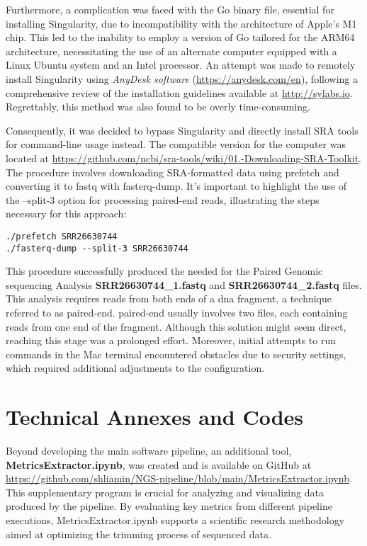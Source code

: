 Furthermore, a complication was faced with the Go binary file, essential for installing Singularity, due to incompatibility with the architecture of Apple's M1 chip. This led to the inability to employ a version of Go tailored for the ARM64 architecture, necessitating the use of an alternate computer equipped with a Linux Ubuntu system and an Intel processor. An attempt was made to remotely install Singularity using \textit{AnyDesk software} (\url{https://anydesk.com/en}), following a comprehensive review of the installation guidelines available at \url{http://sylabs.io}. Regrettably, this method was also found to be overly time-consuming.

Consequently, it was decided to bypass Singularity and directly install SRA tools for command-line usage instead. The compatible version for the computer was located at \url{https://github.com/ncbi/sra-tools/wiki/01.-Downloading-SRA-Toolkit}. The procedure involves downloading SRA-formatted data using prefetch and converting it to \gls{fastq} with fasterq-dump. It's important to highlight the use of the --split-3 option for processing paired-end \gls{read}s, illustrating the steps necessary for this approach:

\begin{verbatim}
./prefetch SRR26630744
./fasterq-dump --split-3 SRR26630744
\end{verbatim}

This procedure successfully produced the needed for the Paired Genomic \gls{sequencing} Analysis \textbf{SRR26630744\_1.fastq} and \textbf{SRR26630744\_2.fastq} files. This analysis requires \gls{read}s from both ends of a \gls{dna} fragment, a technique referred to as \gls{paired-end}. \gls{paired-end} usually involves two files, each containing reads from one end of the fragment. Although this solution might seem direct, reaching this stage was a prolonged effort. Moreover, initial attempts to run commands in the Mac terminal encountered obstacles due to security settings, which required additional adjustments to the configuration.


\section{Technical Annexes and Codes}

Beyond developing the main software pipeline, an additional tool, \textbf{MetricsExtractor.ipynb}, was created and is available on GitHub at \url{https://github.com/shliamin/NGS-pipeline/blob/main/MetricsExtractor.ipynb}. This supplementary program is crucial for analyzing and visualizing data produced by the pipeline. By evaluating key \gls{metrics} from different pipeline executions, MetricsExtractor.ipynb supports a scientific research methodology aimed at optimizing the \gls{trimming} process of sequenced data. 

